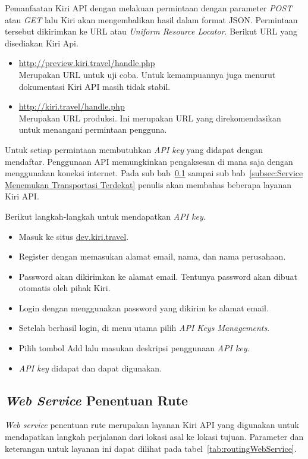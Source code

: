 Pemanfaatan Kiri API dengan melakuan permintaan dengan parameter \textit{POST} atau \textit{GET} lalu Kiri akan mengembalikan hasil dalam format JSON. Permintaan tersebut dikirimkan ke URL atau \textit{Uniform Resource Locator}. Berikut URL yang disediakan Kiri Api.
\begin{itemize}
	\item \url{http://preview.kiri.travel/handle.php} \\
	Merupakan URL untuk uji coba. Untuk kemampuannya juga menurut dokumentasi Kiri API masih tidak stabil.
	\item \url{http://kiri.travel/handle.php} \\
	Merupakan URL produksi. Ini merupakan URL yang direkomendasikan untuk menangani permintaan pengguna.
\end{itemize}
Untuk setiap permintaan membutuhkan \textit{API key} yang didapat dengan mendaftar\cite{Kiri}. Penggunaan API memungkinkan pengaksesan di mana saja dengan menggunakan koneksi internet. Pada sub bab~\ref{subsec:Web Service Penentuan Rute} sampai sub bab~\ref{subsec:Service Menemukan Transportasi Terdekat} penulis akan membahas beberapa layanan Kiri API.

Berikut langkah-langkah untuk mendapatkan \textit{API key}.
\begin{itemize}
	\item Masuk ke situs \url{dev.kiri.travel}.
	\item Register dengan memasukan alamat email, nama, dan nama perusahaan.
	\item Password akan dikirimkan ke alamat email. Tentunya password akan dibuat otomatis oleh pihak Kiri.
	\item Login dengan menggunakan password yang dikirim ke alamat email. 
	\item Setelah berhasil login, di menu utama pilih \textit{API Keys Managements}.
	\item Pilih tombol Add lalu masukan deskripsi penggunaan \textit{API key}.
	\item \textit{API key} didapat dan dapat digunakan.
\end{itemize}

\subsection{\textit{Web Service} Penentuan Rute}
\label{subsec:Web Service Penentuan Rute}
\hspace{0.5cm} \textit{Web service} penentuan rute merupakan layanan Kiri API yang digunakan untuk mendapatkan langkah perjalanan dari lokasi asal ke lokasi tujuan. Parameter dan keterangan untuk layanan ini dapat dilihat pada tabel~\ref{tab:routingWebService}.

